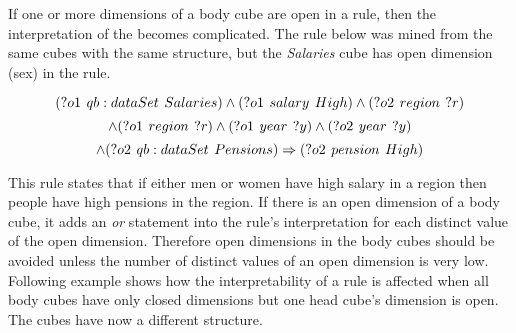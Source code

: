 If one or more dimensions of a body cube are open in a rule, then the interpretation of the becomes complicated. The rule below was mined from the same cubes with the same structure, but the \textit{Salaries} cube has open dimension (sex) in the rule.

$$
(?o1\hspace{0.4em}qb:dataSet\hspace{0.4em}Salaries) \land (?o1\hspace{0.4em}salary\hspace{0.4em}High) \land (?o2\hspace{0.4em}region\hspace{0.4em}?r)
$$
$$
\land (?o1\hspace{0.4em}region\hspace{0.4em}?r) \land (?o1\hspace{0.4em}year\hspace{0.4em}?y) \land (?o2\hspace{0.4em}year\hspace{0.4em}?y)
$$
$$
\land (?o2\hspace{0.4em}qb:dataSet\hspace{0.4em}Pensions) \Rightarrow (?o2\hspace{0.4em}pension\hspace{0.4em}High)
$$

This rule states that if either men or women have high salary in a region then people have high pensions in the region. If there is an open dimension of a body cube, it adds an \textit{or} statement into the rule's interpretation for each distinct value of the open dimension. Therefore open dimensions in the body cubes should be avoided unless the number of distinct values of an open dimension is very low. Following example shows how the interpretability of a rule is affected when all body cubes have only closed dimensions but one head cube's dimension is open. The cubes have now a different structure.

